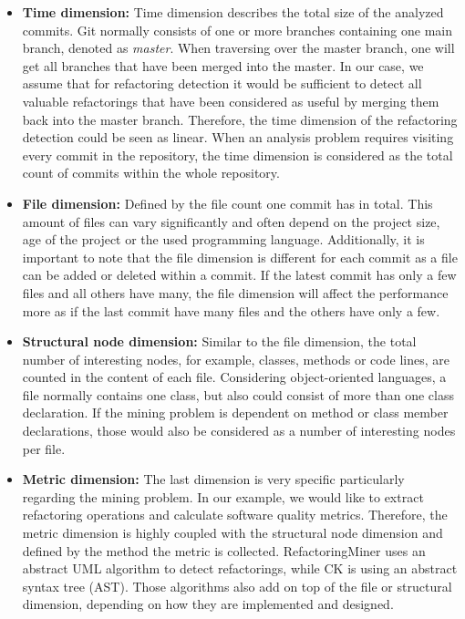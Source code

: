 \begin{itemize}
	
    \item{\textbf{Time dimension:} Time dimension describes the total size of the analyzed commits. Git normally consists of one or more branches containing one main branch, denoted as \emph{master}. When traversing over the master branch, one will get all branches that have been merged into the master. In our case, we assume that for refactoring detection it would be sufficient to detect all valuable refactorings that have been considered as useful by merging them back into the master branch. Therefore, the time dimension of the refactoring detection could be seen as linear. When an analysis problem requires visiting every commit in the repository, the time dimension is considered as the total count of commits within the whole repository. }
    
    \smallskip
    \item{\textbf{File dimension:} Defined by the file count one commit has in total. This amount of files can vary significantly and often depend on the project size, age of the project or the used programming language. Additionally, it is important to note that the file dimension is different for each commit as a file can be added or deleted within a commit. If the latest commit has only a few files and all others have many, the file dimension will affect the performance more as if the last commit have many files and the others have only a few. }
    
    \smallskip
    \item{\textbf{Structural node dimension:} Similar to the file dimension, the total number of interesting nodes, for example, classes, methods or code lines, are counted in the content of each file. Considering object-oriented languages, a file normally contains one class, but also could consist of more than one class declaration. If the mining problem is dependent on method or class member declarations, those would also be considered as a number of interesting nodes per file.}
    
    \smallskip
    \item{\textbf{Metric dimension:} The last dimension is very specific particularly regarding the mining problem. In our example, we would like to extract refactoring operations and calculate software quality metrics. Therefore, the metric dimension is highly coupled with the structural node dimension and defined by the method the metric is collected. RefactoringMiner \cite{Tsantalis:ICSE:2018:RefactoringMiner}} uses an abstract UML algorithm to detect refactorings, while CK \cite{aniche-ck} is using an abstract syntax tree (AST). Those algorithms also add on top of the file or structural dimension, depending on how they are implemented and designed.
\end{itemize}

